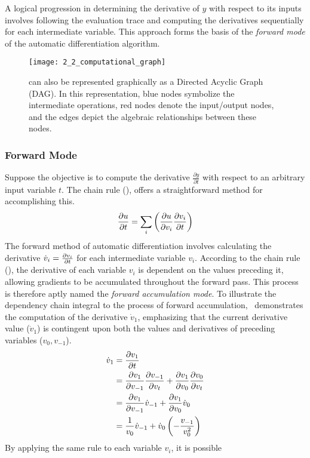 A logical progression in determining the derivative of $y$ with respect to its
inputs involves following the evaluation trace and computing the derivatives
sequentially for each intermediate variable. This approach forms the basis of
the \emph{forward mode} of the automatic differentiation algorithm.
\begin{figure}
  \texttt{[image: 2\_2\_computational\_graph]}
  \caption[Computational Graph]{ can also be represented
    graphically as a Directed Acyclic Graph (DAG). In this representation, blue
    nodes symbolize the intermediate operations, red nodes denote the
    input/output nodes, and the edges depict the algebraic relationships
    between these nodes.}
\end{figure}
\subsubsection{Forward Mode}
Suppose the objective is to compute the derivative $\frac{\partial y}{\partial
t}$ with respect to an arbitrary input variable $t$. The chain rule
(), offers a straightforward method for accomplishing this.
\begin{equation}
    \labeq{2_7}
    \der{u}{t} = \sum_i \left( \der{u}{v_i}\der{v_i}{t}\right)
\end{equation} The forward method of automatic differentiation involves calculating the
derivative $\dot{v}_i = \frac{\partial v_i}{\partial t}$ for each intermediate variable
$v_i$. According to the chain rule (), the derivative of each
variable $v_i$ is dependent on the values preceding it, allowing gradients to
be accumulated throughout the forward pass. This process is therefore aptly
named the \emph{forward accumulation mode}. To illustrate the dependency chain
integral to the process of forward accumulation,~
demonstrates the computation of the derivative $\dot{v}_1$, emphasizing that
the current derivative value ($\dot{v}_1$) is contingent upon both the values
and derivatives of preceding variables ($v_0, v_{-1}$).
\begin{equation}
    \labeq{2_8}
    \begin{split}
        \dot{v}_1 &= \frac{\partial v_1}{\partial t}\\
        &= \frac{\partial v_1}{\partial v_{-1}}\frac{\partial v_{-1}}{\partial
        v_{t}} + \frac{\partial v_1}{\partial v_0}\frac{\partial
        v_0}{\partial v_t}\\
        &= \frac{\partial v_1}{\partial v_{-1}}\dot{v}_{-1} + \frac{\partial
        v_1}{\partial v_0}\dot{v}_0\\
        &= \frac{1}{v_0} \dot{v}_{-1} + \dot{v}_0 \left(-\frac{v_{-1}}{v_0^2}\right)
    \end{split}
\end{equation} By applying the same rule to each variable $v_i$, it is possible
